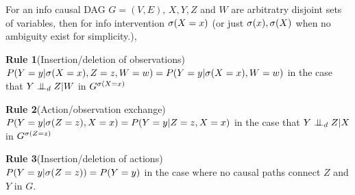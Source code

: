 \begin{Thm}
	\label{thm:rules}
	For an info causal DAG $G=(V, E)$, $X, Y, Z$ and $W$ are arbitratry disjoint sets of variables, then for info intervention $\mathrm{\sigma}(X=x)$ (or just $\mathrm{\sigma}(x), \mathrm{\sigma}(X)$ when no ambiguity exist for simplicity.), 
	
	\textbf{Rule 1}(Insertion/deletion of observations) \\
	$P(Y=y|\mathrm{\sigma}(X=x), Z=z, W=w) = P(Y=y|\mathrm{\sigma}(X=x), W=w)$ in the case that $Y \perp\mkern-9.5mu\perp_d Z|W$ in $G^{\mathrm{\sigma}(X=x)}$
	
	\textbf{Rule 2}(Action/observation exchange) \\
	$P(Y=y|\mathrm{\sigma}(Z=z), X=x) = P(Y=y|Z=z, X=x)$  in the case that $Y\perp\mkern-9.5mu\perp_d Z|X$ in $G^{\mathrm{\sigma}(Z=z)}$   
	
	\textbf{Rule 3}(Insertion/deletion of actions) \\
	$P(Y=y|\mathrm{\sigma}(Z=z)) = P(Y=y)$ in the case where no causal paths connect $Z$ and $Y$ in $G$.  
\end{Thm}

